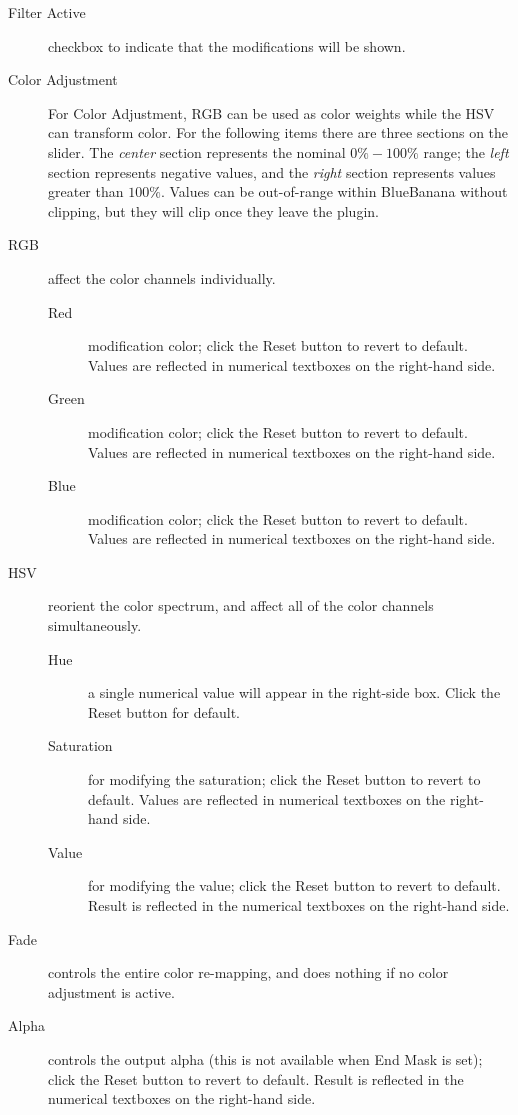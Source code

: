 \begin{description}
    \item[Filter Active] checkbox to indicate that the modifications will be shown.
    \item[Color Adjustment ] For Color Adjustment, RGB can be used as color weights while the HSV can transform color.
    For the following items there are three sections on the slider. The \textit{center} section represents the nominal $0\%-100\%$ range; the \textit{left} section represents negative values, and the \textit{right} section represents values greater than $100\%$. Values can be out-of-range within BlueBanana without clipping, but they will clip once they leave the plugin.    
    \item[RGB] affect the color channels individually.
    \begin{description}
        \item[Red] modification color; click the Reset button to revert to default. Values are reflected in numerical textboxes on the right-hand side.
        \item[Green] modification color; click the Reset button to revert to default. Values are reflected in numerical textboxes on the right-hand side.
        \item[Blue] modification color; click the Reset button to revert to default. Values are reflected in numerical textboxes on the right-hand side.
    \end{description}
    \item[HSV] reorient the color spectrum, and affect all of the color channels simultaneously.
    \begin{description}
        \item[Hue] a single numerical value will appear in the right-side box. Click the Reset button for default.
        \item[Saturation] for modifying the saturation; click the Reset button to revert to default. Values are reflected in numerical textboxes on the right-hand side.
        \item[Value] for modifying the value; click the Reset button to revert to default. Result is reflected in the numerical textboxes on the right-hand side.
    \end{description}
    \item[Fade] controls the entire color re-mapping, and does nothing if no color adjustment is active.
    \item[Alpha] controls the output alpha (this is not available when End Mask is set); click the Reset button to revert to default. Result is reflected in the numerical textboxes on the right-hand side.
\end{description}

